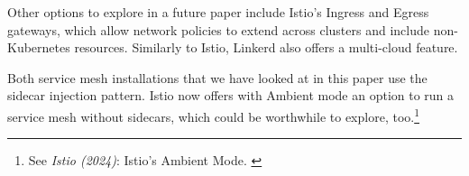 Other options to explore in a future paper include Istio's Ingress and Egress gateways, which allow network policies to extend across clusters and include non-Kubernetes resources. Similarly to Istio, Linkerd also offers a multi-cloud feature.

Both service mesh installations that we have looked at in this paper use the sidecar injection pattern. Istio now offers with Ambient mode an option to run a service mesh without sidecars, which could be worthwhile to explore, too.\footnote{See \textit{Istio (2024)}: Istio's Ambient Mode. \cite{istioAmbient}}
